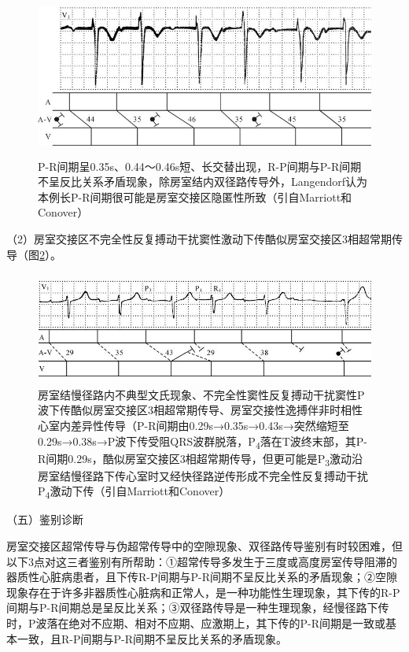 \begin{figure}[!htbp]
 \centering
 \includegraphics[width=5.01042in,height=2.09375in]{./images/Image00479.jpg}
 \captionsetup{justification=centering}
 \caption{P-R间期呈0.35s、0.44～0.46s短、长交替出现，R-P间期与P-R间期不呈反比关系矛盾现象，除房室结内双径路传导外，Langendorf认为本例长P-R间期很可能是房室交接区隐匿性所致（引自Marriott和Conover）}
 \label{fig28-18}
  \end{figure} 

（2）房室交接区不完全性反复搏动干扰窦性激动下传酷似房室交接区3相超常期传导（图\ref{fig28-19}）。

\begin{figure}[!htbp]
 \centering
 \includegraphics[width=5.125in,height=1.45833in]{./images/Image00480.jpg}
 \captionsetup{justification=centering}
 \caption{房室结慢径路内不典型文氏现象、不完全性窦性反复搏动干扰窦性P波下传酷似房室交接区3相超常期传导、房室交接性逸搏伴非时相性心室内差异性传导（P-R间期由0.29s→0.35s→0.43s→突然缩短至0.29s→0.38s→P波下传受阻QRS波群脱落，P\textsubscript{4}落在T波终末部，其P-R间期0.29s，酷似房室交接区3相超常期传导，但更可能是P\textsubscript{3}激动沿房室结慢径路下传心室时又经快径路逆传形成不完全性反复搏动干扰P\textsubscript{4}激动下传（引自Marriott和Conover）}
 \label{fig28-19}
  \end{figure} 


（五）鉴别诊断

房室交接区超常传导与伪超常传导中的空隙现象、双径路传导鉴别有时较困难，但以下3点对这三者鉴别有所帮助：①超常传导多发生于三度或高度房室传导阻滞的器质性心脏病患者，且下传R-P间期与P-R间期不呈反比关系的矛盾现象；②空隙现象存在于许多非器质性心脏病和正常人，是一种功能性生理现象，其下传的R-P间期与P-R间期总是呈反比关系；③双径路传导是一种生理现象，经慢径路下传时，P波落在绝对不应期、相对不应期、应激期上，其下传的P-R间期是一致或基本一致，且R-P间期与P-R间期不呈反比关系的矛盾现象。

